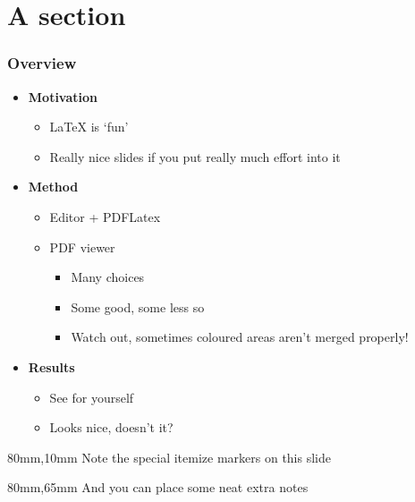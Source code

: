\documentclass[mathserif, fleqn]{beamer}
\begin{document}
\begin{frame}
  \titlepage
\end{frame}

\section{A section}
\begin{frame}\frametitle{Overview}

  \begin{itemize}\setlength{\itemsep}{1.5ex}
  \item \textbf{Motivation}
    \begin{itemize}\setlength{\itemsep}{1ex}
    \item \LaTeX{} is `fun'
    \item Really nice slides if you put really much effort into it
    \end{itemize}
  \item \textbf{Method}
    \begin{itemize}\setlength{\itemsep}{1ex}
    \item Editor + PDFLatex
    \item PDF viewer
      \begin{itemize}
      \item Many choices
      \item Some good, some less so
      \item Watch out, sometimes coloured areas aren't merged properly!
      \end{itemize}
    \end{itemize}
  \item \textbf{Results}
    \begin{itemize}\setlength{\itemsep}{1ex}
    \item See for yourself
    \item Looks nice, doesn't it?
    \end{itemize}
  \end{itemize}

  \begin{aside}{40mm}{80mm,10mm}
    Note the special itemize markers on this slide
  \end{aside}

  \begin{aside}{30mm}{80mm,65mm}
    And you can place some neat extra notes
  \end{aside}
\end{frame}
\end{document}
